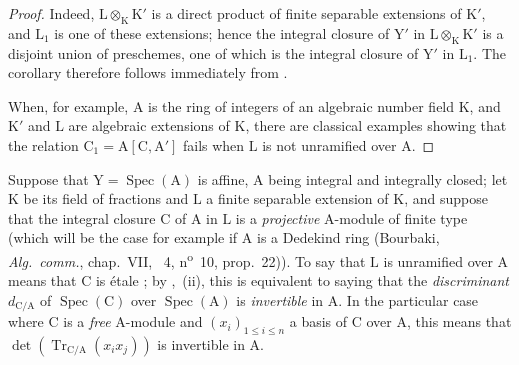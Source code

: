 \begin{proof}
Indeed, $\mathrm{L}\otimes_{\mathrm{K}}\mathrm{K}'$ is a direct product of finite separable extensions of $\mathrm{K}'$, and $\mathrm{L}_1$
is one of these extensions; hence the integral closure of $\mathrm{Y}'$ in $\mathrm{L}\otimes_{\mathrm{K}}\mathrm{K}'$ is a disjoint union of preschemes, one of which is the integral closure of $\mathrm{Y}'$ in $\mathrm{L}_1$.
The corollary therefore follows immediately from .

When, for example, $\mathrm{A}$ is the ring of integers of an algebraic number field $\mathrm{K}$, and $\mathrm{K}'$ and $\mathrm{L}$ are algebraic extensions of $\mathrm{K}$, there are classical examples showing that the relation $\mathrm{C}_1=\mathrm{A}[\mathrm{C},\mathrm{A}']$ fails when $\mathrm{L}$ is not unramified over $\mathrm{A}$.
\end{proof}

\begin{env}[18.10.15]
\label{IV.18.10.15}
Suppose that $\mathrm{Y}=\operatorname{Spec}(\mathrm{A})$ is affine, $\mathrm{A}$ being integral and integrally closed; let $\mathrm{K}$ be its field of fractions and $\mathrm{L}$ a finite separable extension of $\mathrm{K}$, and suppose that the integral closure $\mathrm{C}$ of $\mathrm{A}$ in $\mathrm{L}$ is a \emph{projective} $\mathrm{A}$-module of finite type (which will be the case for example if $\mathrm{A}$ is a Dedekind ring (Bourbaki, \emph{Alg.\ comm.}, chap.~VII, \textsection~4, n\textsuperscript{o}~10, prop.~22)).
To say that $\mathrm{L}$ is unramified over $\mathrm{A}$ means that $\mathrm{C}$ is \'etale ; by ,~(ii), this is equivalent to saying that the \emph{discriminant} $d_{\mathrm{C}/\mathrm{A}}$ of $\operatorname{Spec}(\mathrm{C})$ over $\operatorname{Spec}(\mathrm{A})$ is \emph{invertible} in $\mathrm{A}$.
In the particular case where $\mathrm{C}$ is a \emph{free} $\mathrm{A}$-module and $(x_i)_{1\leq i\leq n}$ a basis of $\mathrm{C}$ over $\mathrm{A}$, this means that $\det(\operatorname{Tr}_{\mathrm{C}/\mathrm{A}}(x_ix_j))$ is invertible in $\mathrm{A}$.
\end{env}

